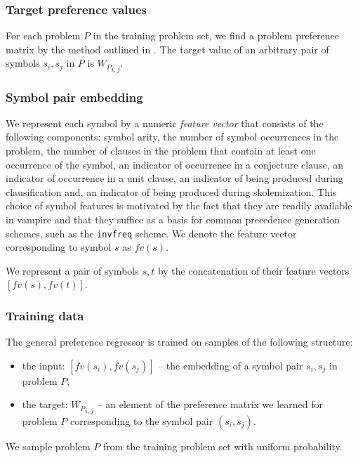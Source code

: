 \subsubsection{Target preference values}
\label{sec:target-preference-values}

For each problem \(P\) in the training problem set,
we find a problem preference matrix by the method outlined in .
The target value of an arbitrary pair of symbols \(s_i, s_j\) in \(P\) is \({W_P}_{i,j}\).

\subsubsection{Symbol pair embedding} \label{sect:embeddings}

We represent each symbol by a numeric \emph{feature vector} that consists of the following components:
symbol arity, %
the number of symbol occurrences in the problem, %
the number of clauses in the problem that contain at least one occurrence of the symbol, %
an indicator of occurrence in a conjecture clause, %
an indicator of occurrence in a unit clause, %
an indicator of being produced during clausification and, %
an indicator of being produced during skolemization. %
This choice of symbol features is motivated by the fact that they
are readily available in %
\gls*{vampire}
and that they suffice as a basis for common precedence generation schemes,
such as the \texttt{invfreq} scheme.
\newcommand{\fv}{\mathit{fv}}
We denote the feature vector corresponding to symbol \(s\) as \(\fv(s)\).

We represent a pair of symbols \(s, t\)
by the concatenation of their feature vectors \([\fv(s), \fv(t)]\).

\subsubsection{Training data}

The general preference regressor is trained on samples of the following structure:

\begin{itemize}
	\item the input: \([\fv(s_i), \fv(s_j)]\) -- the embedding of a symbol pair \(s_i, s_j\) in problem \(P\),
	\item the target: \({W_P}_{i,j}\) -- an element of the preference matrix we learned for problem \(P\)
	corresponding to the symbol pair \((s_i,s_j)\).
\end{itemize}
We sample problem \(P\) from the training problem set with uniform probability.

